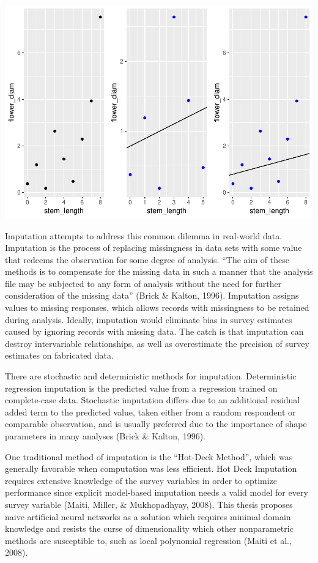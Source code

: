 \documentclass[12pt,twoside]{reedthesis}
\begin{document}
\includegraphics{thesis_files/figure-latex/systematic-1.pdf}

Imputation attempts to address this common dilemma in real-world data.
Imputation is the process of replacing missingness in data sets with
some value that redeems the observation for some degree of analysis.
``The aim of these methods is to compensate for the missing data in such
a manner that the analysis file may be subjected to any form of analysis
without the need for further consideration of the missing data'' (Brick
\& Kalton, 1996). Imputation assigns values to missing responses, which
allows records with missingness to be retained during analysis. Ideally,
imputation would eliminate bias in survey estimates caused by ignoring
records with missing data. The catch is that imputation can destroy
intervariable relationships, as well as overestimate the precision of
survey estimates on fabricated data.

There are stochastic and deterministic methods for imputation.
Deterministic regression imputation is the predicted value from a
regression trained on complete-case data. Stochastic imputation differs
due to an additional residual added term to the predicted value, taken
either from a random respondent or comparable observation, and is
usually preferred due to the importance of shape parameters in many
analyses (Brick \& Kalton, 1996).

One traditional method of imputation is the ``Hot-Deck Method'', which
was generally favorable when computation was less efficient. Hot Deck
Imputation requires extensive knowledge of the survey variables in order
to optimize performance since explicit model-based imputation needs a
valid model for every survey variable (Maiti, Miller, \& Mukhopadhyay,
2008). This thesis proposes naive artificial neural networks as a
solution which requires minimal domain knowledge and resists the curse
of dimensionality which other nonparametric methods are susceptible to,
such as local polynomial regression (Maiti et al., 2008).
\end{document}
